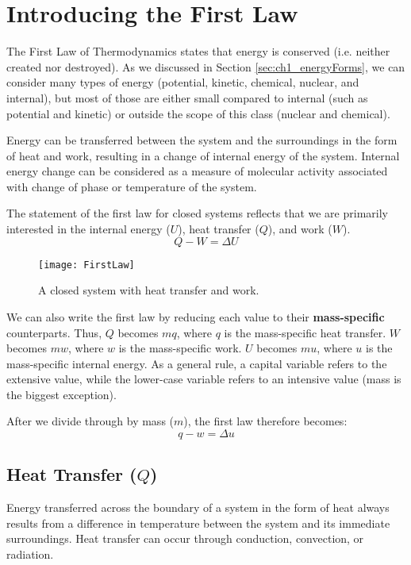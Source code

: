 \section{Introducing the First Law}
The First Law of Thermodynamics states that energy is conserved (i.e. neither created nor destroyed).  As we discussed in Section \ref{sec:ch1_energyForms}, we can consider many types of energy (potential, kinetic, chemical, nuclear, and internal), but most of those are either small compared to internal (such as potential and kinetic) or outside the scope of this class (nuclear and chemical).

Energy can be transferred between the system and the surroundings in the form of heat and work, resulting in a change of internal energy of the system. Internal energy change can be considered as a measure of molecular activity associated with change of phase or temperature of the system.

The statement of the first law for closed systems reflects that we are primarily interested in the internal energy ($U$), heat transfer ($Q$), and work ($W$).
\begin{equation} \label{eq:1stLawClosed}
  Q - W = \Delta U
\end{equation}

\begin{figure}[H]
\centering
\texttt{[image: FirstLaw]}
\caption{A closed system with heat transfer and work.}
\label{fig:ch2_energyEquation}
\end{figure}

We can also write the first law by reducing each value to their {\bf mass-specific} counterparts.  Thus, $Q$ becomes $mq$, where $q$ is the mass-specific heat transfer.  $W$ becomes $mw$, where $w$ is the mass-specific work.  $U$ becomes $mu$, where $u$ is the mass-specific internal energy.  As a general rule, a capital variable refers to the extensive value, while the lower-case variable refers to an intensive value (mass is the biggest exception).

After we divide through by mass ($m$), the first law therefore becomes:
\begin{equation*}
  q - w = \Delta u
\end{equation*}

\subsection{Heat Transfer ($Q$)}
Energy transferred across the boundary of a system in the form of heat always results from a difference in temperature between the system and its immediate surroundings.  Heat transfer can occur through conduction, convection, or radiation.

